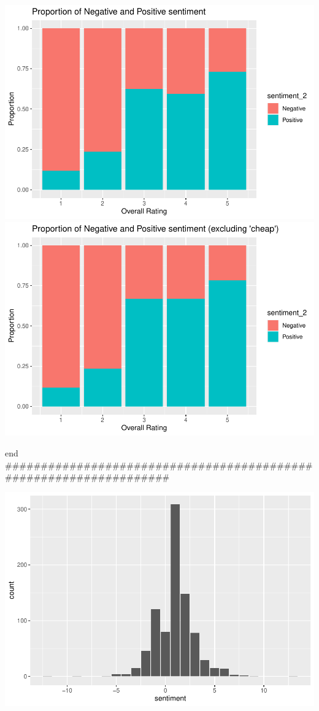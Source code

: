 \documentclass[
  11pt,
]{article}
\begin{document}
\includegraphics{Assignment-STAT702_files/figure-latex/unnamed-chunk-2-1.pdf}
\includegraphics{Assignment-STAT702_files/figure-latex/unnamed-chunk-2-2.pdf}

end
\#\#\#\#\#\#\#\#\#\#\#\#\#\#\#\#\#\#\#\#\#\#\#\#\#\#\#\#\#\#\#\#\#\#\#\#\#\#\#\#\#\#\#\#\#\#\#\#\#\#\#\#\#\#\#\#\#\#\#\#\#\#\#\#\#\#

\includegraphics{Assignment-STAT702_files/figure-latex/unnamed-chunk-3-1.pdf}
\end{document}

